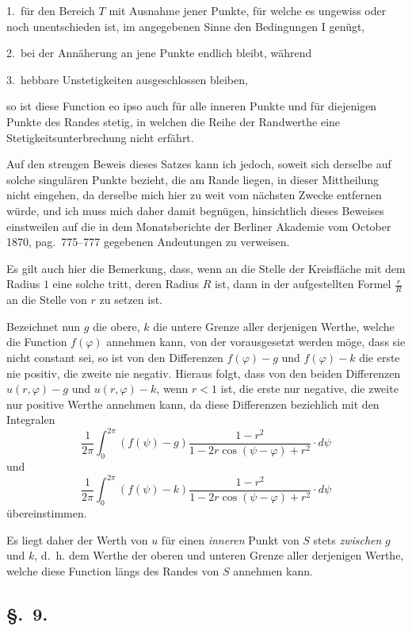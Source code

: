 \documentclass{article}
\begin{document}
1.~für den Bereich $T$ mit Ausnahme jener Punkte, für welche es ungewiss oder noch unentschieden ist, im angegebenen Sinne den Bedingungen I genügt,

2.~bei der Annäherung an jene Punkte endlich bleibt, während

3.~hebbare Unstetigkeiten ausgeschlossen bleiben,

so ist diese Function eo ipso auch für alle inneren Punkte und für diejenigen Punkte des Randes stetig, in welchen die Reihe der Randwerthe eine Stetigkeitsunterbrechung nicht erfährt.

Auf den strengen Beweis dieses Satzes kann ich jedoch, soweit sich derselbe auf solche singulären Punkte bezieht, die am Rande liegen, in dieser Mittheilung nicht eingehen, da derselbe mich hier zu weit vom nächsten Zwecke entfernen würde, und ich muss mich daher damit begnügen, hinsichtlich dieses Beweises einstweilen auf die in dem Monatsberichte der Berliner Akademie vom October 1870, pag.~775--777 gegebenen Andeutungen zu verweisen.

Es gilt auch hier die Bemerkung, dass, wenn an die Stelle der Kreisfläche mit dem Radius $1$ eine solche tritt, deren Radius $R$ ist, dann in der aufgestellten Formel $\frac{r}{R}$ an die Stelle von $r$ zu setzen ist.

Bezeichnet nun $g$ die obere, $k$ die untere Grenze aller derjenigen Werthe, welche die Function $f(\varphi)$ annehmen kann, von der vorausgesetzt werden möge, dass sie nicht constant sei, so ist von den Differenzen $f(\varphi) - g$ und $f(\varphi) - k$ die erste nie positiv, die zweite nie negativ. Hieraus folgt, dass von den beiden Differenzen $u(r, \varphi) - g$ und $u(r, \varphi) - k$, wenn $r < 1$ ist, die erste nur negative, die zweite nur positive Werthe annehmen kann, da diese Differenzen beziehlich mit den Integralen
\[
\frac{1}{2\pi} \int_0^{2\pi} (f(\psi) - g) \frac{1 - r^2}{1 - 2r \cos(\psi - \varphi) + r^2} \cdot d\psi
\]
und
\[
\frac{1}{2\pi} \int_0^{2\pi} (f(\psi) - k) \frac{1 - r^2}{1 - 2r \cos(\psi - \varphi) + r^2} \cdot d\psi
\]
übereinstimmen.

Es liegt daher der Werth von $u$ für einen \emph{inneren} Punkt von $S$ stets \emph{zwischen} $g$ und $k$, d.~h. dem Werthe der oberen und unteren Grenze aller derjenigen Werthe, welche diese Function längs des Randes von $S$ annehmen kann.

\subsection*{§.~9.}
\end{document}
